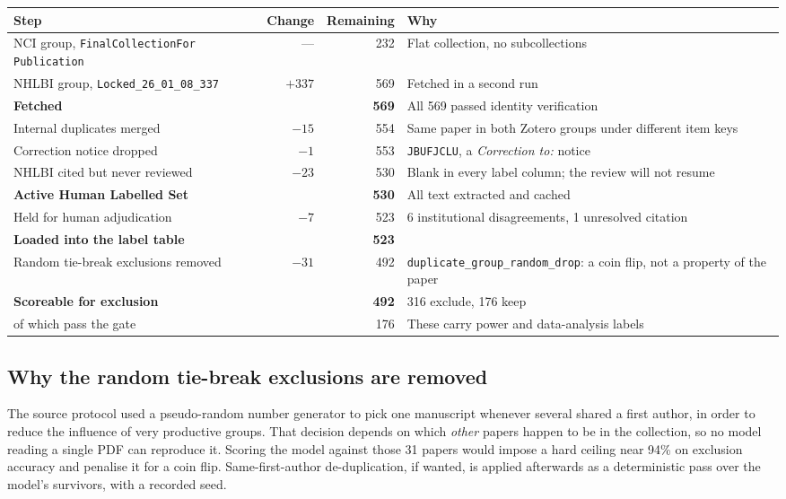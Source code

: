 \documentclass[11pt]{article}
\begin{document}
\begin{table}[h]
\centering
\begin{tabular}{lrrl}
\toprule
\textbf{Step} & \textbf{Change} & \textbf{Remaining} & \textbf{Why} \\
\midrule
NCI group, \texttt{FinalCollectionFor Publication} & --- & 232 & Flat collection, no subcollections \\
NHLBI group, \texttt{Locked\_26\_01\_08\_337} & $+337$ & 569 & Fetched in a second run \\
\midrule
\textbf{Fetched} & & \textbf{569} & All 569 passed identity verification \\
\midrule
Internal duplicates merged & $-15$ & 554 & Same paper in both Zotero groups under different item keys \\
Correction notice dropped & $-1$ & 553 & \texttt{JBUFJCLU}, a \emph{Correction to:} notice \\
NHLBI cited but never reviewed & $-23$ & 530 & Blank in every label column; the review will not resume \\
\midrule
\textbf{Active Human Labelled Set} & & \textbf{530} & All text extracted and cached \\
\midrule
Held for human adjudication & $-7$ & 523 & 6 institutional disagreements, 1 unresolved citation \\
\midrule
\textbf{Loaded into the label table} & & \textbf{523} & \\
\midrule
Random tie-break exclusions removed & $-31$ & 492 & \texttt{duplicate\_group\_random\_drop}: a coin flip, not a property of the paper \\
\midrule
\textbf{Scoreable for exclusion} & & \textbf{492} & 316 exclude, 176 keep \\
\quad of which pass the gate & & 176 & These carry power and data-analysis labels \\
\bottomrule
\end{tabular}
\end{table}

\subsection*{Why the random tie-break exclusions are removed}

The source protocol used a pseudo-random number generator to pick one manuscript whenever several
shared a first author, in order to reduce the influence of very productive groups. That decision
depends on which \emph{other} papers happen to be in the collection, so no model reading a single PDF
can reproduce it. Scoring the model against those 31 papers would impose a hard ceiling near 94\% on
exclusion accuracy and penalise it for a coin flip. Same-first-author de-duplication, if wanted, is
applied afterwards as a deterministic pass over the model's survivors, with a recorded seed.
\end{document}
